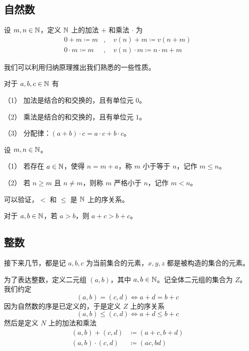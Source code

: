 \subsection{自然数}

设 $m,n\in \mathbb{N}$，定义 $\NN$ 上的加法 $+$ 和乘法 $\cdot$ 为
\begin{equation*}
	\begin{aligned}
		0+m\coloneqq m      & ,\quad v(n)+m\coloneqq v(n+m)             \\
		0\cdot m\coloneqq m & ,\quad v(n)\cdot m\coloneqq n \cdot m + m
	\end{aligned}
\end{equation*}

我们可以利用归纳原理推出我们熟悉的一些性质。

\begin{theorem}[$\NN$ 的代数算律]
	对于 $a,b,c\in \mathbb{N}$ 有

	（1） 加法是结合的和交换的，且有单位元 $0$。

	（2） 乘法是结合的和交换的，且有单位元 $1$。

	（3） 分配律：$(a+b) \cdot  c = a \cdot c + b\cdot c$。
\end{theorem}

\begin{definition}[$\NN$ 的序]
	设 $m,n\in \mathbb{N}$。

	（1） 若存在 $a\in \mathbb{N}$，使得 $n=m+a$，称 $m$ 小于等于 $n$，记作 $m \leqslant n$。

	（2） 若 $n\geqslant m$ 且 $n\ne m$，则称 $m$ 严格小于 $n$，记作 $m < n$。
\end{definition}

可以验证，$<$ 和 $\leqslant$ 是 $\NN$ 上的序关系。

\begin{theorem}[加法保序]
	对于 $a,b\in \mathbb{N}$，若 $a>b$，则 $a+c>b+c$。
\end{theorem}

\subsection{整数}

接下来几节，都是记 $a,b,c$ 为当前集合的元素，$x,y,z$ 都是被构造的集合的元素。

为了表达整数，定义二元组 $(a,b)$，其中 $a,b \in \mathbb{N}$。记全体二元组的集合为 $Z$。我们约定
$$(a,b) = (c,d) \Leftrightarrow a+d=b+c$$
因为自然数的序是已定义的，于是定义 $Z$ 上的序关系
$$(a,b) \leqslant (c,d) \Leftrightarrow a+d \leqslant b+c$$
然后是定义 $N$ 上的加法和乘法
\begin{equation*}
	\begin{aligned}
		(a,b) + (c,d)     & \coloneqq  (a+c,b+d) \\
		(a,b) \cdot (c,d) & \coloneqq  (a c,b d)
	\end{aligned}
\end{equation*}

